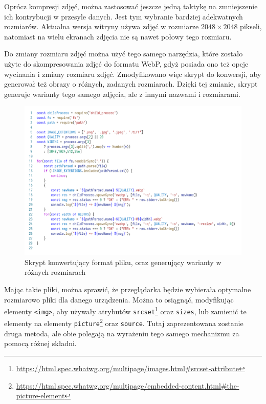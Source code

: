 \documentclass[licencjacka]{pracadypl}
\begin{document}
Oprócz kompresji zdjęć, można zastosować jeszcze jedną taktykę na zmniejszenie ich kontrybucji w przesyle danych. Jest tym wybranie bardziej adekwatnych rozmiarów. Aktualna wersja witryny używa zdjęć w rozmiarze $2048\times2048$ pikseli, natomiast na wielu ekranach zdjęcia nie są nawet połowy tego rozmiaru.

Do zmiany rozmiaru zdjęć można użyć tego samego narzędzia, które zostało użyte do skompresowania zdjęć do formatu WebP, gdyż posiada ono też opcje wycinania i zmiany rozmiaru zdjęć. Zmodyfikowano więc skrypt do konwersji, aby generował też obrazy o różnych, zadanych rozmiarach. 
Dzięki tej zmianie, skrypt generuje warianty tego samego zdjęcia, ale z innymi nazwami i rozmiarami.

\begin{figure}[H]
  \centering
  \includegraphics[width=\linewidth]{images/code_script_conv_format_and_size.png}
  \caption{Skrypt konwertujący format pliku, oraz generujący warianty w różnych rozmiarach}
  \label{fig:script-format-and-size}
\end{figure}

Mając takie pliki, można sprawić, że przeglądarka będzie wybierała optymalne rozmiarowo pliki dla danego urządzenia. Można to osiągnąć, modyfikując elementy \texttt{<img>}, aby używały atrybutów \texttt{srcset}\footnote{\url{https://html.spec.whatwg.org/multipage/images.html\#srcset-attribute}} oraz \texttt{sizes}, lub zamienić te elementy na elementy \texttt{picture}\footnote{\url{https://html.spec.whatwg.org/multipage/embedded-content.html\#the-picture-element}} oraz \texttt{source}. Tutaj zaprezentowana zostanie druga metoda, ale obie polegają na wyrażeniu tego samego mechanizmu za pomocą różnej składni.
\end{document}
